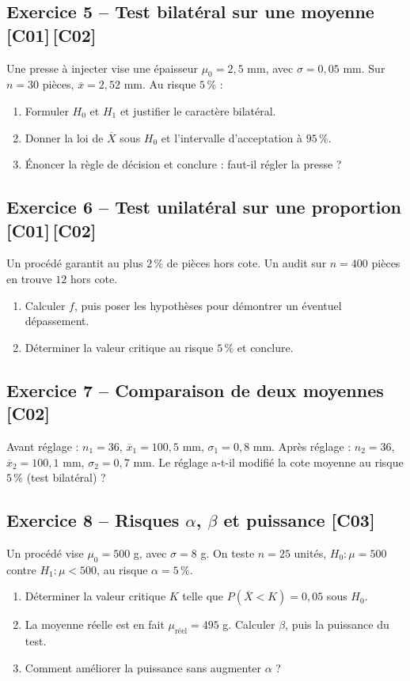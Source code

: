\documentclass[a4paper,11pt]{article}
\begin{document}
\subsection*{Exercice 5 -- Test bilatéral sur une moyenne \hfill {\normalsize\color{uimmred}[C01]\,[C02]}}
Une presse à injecter vise une épaisseur $\mu_0 = 2{,}5$ mm, avec $\sigma = 0{,}05$ mm. Sur $n = 30$ pièces, $\overline{x} = 2{,}52$ mm. Au risque $5\,\%$ :
\begin{enumerate}[label=\alph*)]
  \item Formuler $H_0$ et $H_1$ et justifier le caractère bilatéral.
  \item Donner la loi de $\overline{X}$ sous $H_0$ et l'intervalle d'acceptation à $95\,\%$.
  \item Énoncer la règle de décision et conclure : faut-il régler la presse ?
\end{enumerate}

\subsection*{Exercice 6 -- Test unilatéral sur une proportion \hfill {\normalsize\color{uimmred}[C01]\,[C02]}}
Un procédé garantit au plus $2\,\%$ de pièces hors cote. Un audit sur $n = 400$ pièces en trouve $12$ hors cote.
\begin{enumerate}[label=\alph*)]
  \item Calculer $f$, puis poser les hypothèses pour démontrer un éventuel dépassement.
  \item Déterminer la valeur critique au risque $5\,\%$ et conclure.
\end{enumerate}

\subsection*{Exercice 7 -- Comparaison de deux moyennes \hfill {\normalsize\color{uimmred}[C02]}}
Avant réglage : $n_1 = 36$, $\overline{x}_1 = 100{,}5$ mm, $\sigma_1 = 0{,}8$ mm. Après réglage : $n_2 = 36$, $\overline{x}_2 = 100{,}1$ mm, $\sigma_2 = 0{,}7$ mm. Le réglage a-t-il modifié la cote moyenne au risque $5\,\%$ (test bilatéral) ?

\subsection*{Exercice 8 -- Risques $\alpha$, $\beta$ et puissance \hfill {\normalsize\color{uimmred}[C03]}}
Un procédé vise $\mu_0 = 500$ g, avec $\sigma = 8$ g. On teste $n = 25$ unités, $H_0 : \mu = 500$ contre $H_1 : \mu < 500$, au risque $\alpha = 5\,\%$.
\begin{enumerate}[label=\alph*)]
  \item Déterminer la valeur critique $K$ telle que $P(\overline{X} < K) = 0{,}05$ sous $H_0$.
  \item La moyenne réelle est en fait $\mu_{\text{réel}} = 495$ g. Calculer $\beta$, puis la puissance du test.
  \item Comment améliorer la puissance sans augmenter $\alpha$ ?
\end{enumerate}
\end{document}

